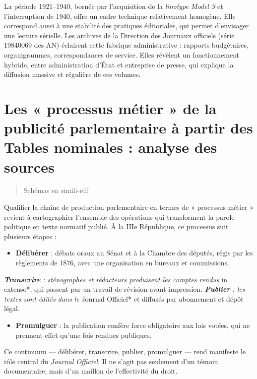 La période 1921–1940, bornée par l’acquisition de la \emph{linotype Model 9} et l’interruption de 1940, offre un cadre technique relativement homogène. Elle correspond aussi à une stabilité des pratiques éditoriales, qui permet d’envisager une lecture sérielle. Les archives de la Direction des Journaux officiels (série 19840069 des AN) éclairent cette fabrique administrative : rapports budgétaires, organigrammes, correspondances de service. Elles révèlent un fonctionnement hybride, entre administration d’État et entreprise de presse, qui explique la diffusion massive et régulière de ces volumes.

\section{Les « processus métier » de la publicité parlementaire à partir des Tables nominales : analyse des sources}

\begin{quote}
Schémas en simili-rdf 

\end{quote}
Qualifier la chaîne de production parlementaire en termes de « processus métier » revient à cartographier l’ensemble des opérations qui transforment la parole politique en texte normatif publié. À la IIIe République, ce processus suit plusieurs étapes :

\begin{itemize}
\item \textbf{Délibérer} : débats oraux au Sénat et à la Chambre des députés, régis par les règlements de 1876, avec une organisation en bureaux et commissions.
\end{itemize}
\emph{ \textbf{Transcrire} : sténographes et rédacteurs produisent les comptes rendus }in extenso*, qui passent par un travail de révision avant impression.
\emph{ \textbf{Publier} : les textes sont édités dans le }Journal Officiel* et diffusés par abonnement et dépôt légal.
\begin{itemize}
\item \textbf{Promulguer} : la publication confère force obligatoire aux lois votées, qui ne prennent effet qu’une fois rendues publiques.

\end{itemize}
Ce continuum — délibérer, transcrire, publier, promulguer — rend manifeste le rôle central du \emph{Journal Officiel}. Il ne s’agit pas seulement d’un témoin documentaire, mais d’un maillon de l’effectivité du droit.

